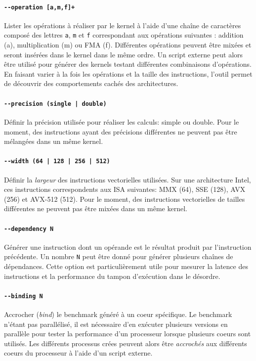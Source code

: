         \paragraph{\texttt{-{}-operation [a,m,f]+}} Lister les opérations à réaliser par le kernel à l'aide d'une chaîne de caractères composé des lettres \texttt{a}, \texttt{m} et \texttt{f} correspondant aux opérations suivantes : addition (a), multiplication (m) ou \gls{FMA} (f). Différentes opérations peuvent être mixées et seront insérées dans le \gls{kernel} dans le même ordre. Un script externe peut alors être utilisé pour générer des kernels testant différentes combinaisons d'opérations. En faisant varier à la fois les opérations et la taille des instructions, l'outil permet de découvrir des comportements cachés des architectures.

        \paragraph{\texttt{-{}-precision (single | double)}} Définir la précision utilisée pour réaliser les calculs: simple ou double. Pour le moment, des instructions ayant des précisions différentes ne peuvent pas être mélangées dans un même kernel.
        
        \paragraph{\texttt{-{}-width (64 | 128 | 256 | 512)}} Définir la \textit{largeur} des instructions vectorielles utilisées. Sur une architecture Intel, ces instructions correspondents aux ISA suivantes: MMX (64), SSE (128), AVX (256) et AVX-512 (512). Pour le moment, des instructions vectorielles de tailles  différentes ne peuvent pas être mixées dans un même kernel.
        
        \paragraph{\texttt{-{}-dependency N}} Générer une instruction  dont un opérande est le résultat produit par l'instruction précédente. Un nombre \texttt{N} peut être donné pour générer plusieurs chaînes de dépendances. Cette option est particulièrement utile pour mesurer la latence des instructions et la performance du tampon d'exécution dans le désordre.
        
        \paragraph{\texttt{-{}-binding N}} Accrocher (\textit{bind}) le benchmark généré à un coeur spécifique. Le benchmark n'étant pas parallélisé, il est nécessaire d'en exécuter plusieurs versions en parallèle pour tester la performance d'un processeur lorsque plusieurs coeurs sont utilisés. Les différents processus crées peuvent alors être \textit{accrochés} aux différents coeurs du processeur à l'aide d'un script externe.
        
